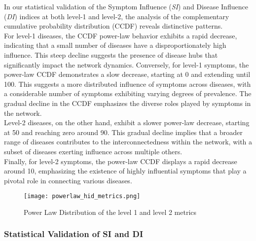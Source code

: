 In our statistical validation of the Symptom Influence (\textit{SI}) and Disease Influence (\textit{DI}) indices at both level-1 and level-2,
the analysis of the complementary cumulative probability distribution (CCDF) reveals distinctive patterns.\\
For level-1 diseases, the CCDF power-law behavior exhibits a rapid decrease, indicating that a small number of diseases
have a disproportionately high influence. This steep decline suggests the presence of disease hubs that significantly impact the network dynamics.
Conversely, for level-1 symptoms, the power-law CCDF demonstrates a slow decrease, starting at 0 and extending until 100.
This suggests a more distributed influence of symptoms across diseases, with a considerable number of symptoms exhibiting
varying degrees of prevalence. The gradual decline in the CCDF emphasizes the diverse roles played by symptoms in the network.\\
Level-2 diseases, on the other hand, exhibit a slower power-law decrease, starting at 50 and reaching zero around 90.
This gradual decline implies that a broader range of diseases contributes to the interconnectedness within the network,
with a subset of diseases exerting influence across multiple others.\\
Finally, for level-2 symptoms, the power-law CCDF displays a rapid decrease around 10,
emphasizing the existence of highly influential symptoms that play a pivotal role in connecting various diseases.

\begin{figure}[H]
    \centering
    \texttt{[image: powerlaw\_hid\_metrics.png]}
    \caption{Power Law Distribution of the level 1 and level 2 metrics}\label{fig:powerlaw_hid_metrics}
\end{figure}
\subsubsection*{Statistical Validation of SI and DI}

